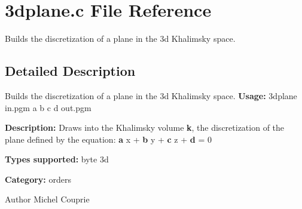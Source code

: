 \section{3dplane.c File Reference}
\label{3dplane_8c}


Builds the discretization of a plane in the 3d Khalimsky space.  




\subsection{Detailed Description}
Builds the discretization of a plane in the 3d Khalimsky space. {\bfseries Usage:} 3dplane in.pgm a b c d out.pgm

{\bfseries Description:} Draws into the Khalimsky volume {\bfseries k}, the discretization of the plane defined by the equation: {\bfseries a} x + {\bfseries b} y + {\bfseries c} z + {\bfseries d} = 0

{\bfseries Types supported:} byte 3d

{\bfseries Category:} orders

\begin{DoxyAuthor}{Author}
Michel Couprie 
\end{DoxyAuthor}
